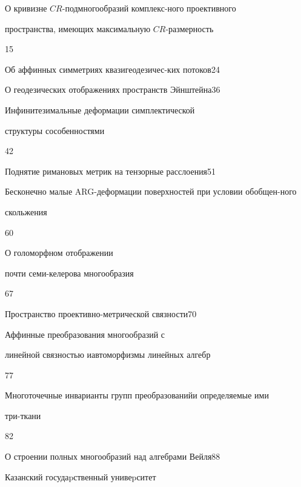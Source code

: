 

{О кривизне $CR$-подмногообразий комплекс-\newline ного проективного


пространства, имеющих максимальную $CR$-размерность}{15}




{Об аффинных симметриях квазигеодезичес-\newline ких потоков}{24}




{О геодезических отображениях пространств Эйнштейна}{36}




{Инфинитезимальные деформации симплектической


структуры с\newline особенностями}{42}




{Поднятие римановых метрик на тензорные расслоения}{51}




{Бесконечно малые ARG-деформации поверхностей при условии обобщен-\newline ного 


скольжения}{60}




{О голоморфном отображении


почти семи-келерова многообразия}{67}




{Пространство проективно-метрической связности}{70}




{Аффинные преобразования многообразий с  


линейной связностью и\newline автоморфизмы линейных алгебр}{77}




{Многоточечные инварианты групп преобразований\newline и определяемые ими


три-ткани}{82}




{О строении полных многообразий над алгебрами Вейля}{88}




























\vfill


\noindent\raisebox{2pt}{\copyright} Казанский госудаpственный унивеpситет





